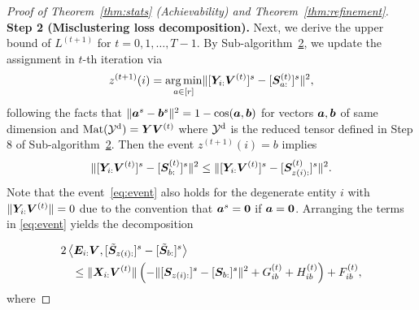 \documentclass[journal]{IEEEtran}
\theoremstyle{definition}
\theoremstyle{definition}
\newcommand{\of}[1]{\left(#1\right)}
\newcommand{\ang}[1]{\left\langle#1\right\rangle}
\begin{document}
\begin{proof}[Proof of Theorem~\ref{thm:stats} (Achievability) and Theorem~\ref{thm:refinement}]
{}

{\bf Step 2 (Misclustering loss decomposition).} Next, we derive the upper bound of $L^{(t+1)}$ for $t = 0 ,1, \ldots, T-1$. By Sub-algorithm~\hyperref[alg:main]{2}, we update the assignment in $t$-th iteration via
    \begin{equation}
        z^{(t+1)}(i) = \operatorname*{arg\,min}_{a \in [r]} \lVert [ \bm Y_{i:} \bm{V}^{(t)}  ]^s - [\bm S_{a:}^{(t)}]^s \rVert^2,
    \end{equation}
    following the facts that $\lVert\bm{a}^s - \bm{b}^s\rVert^2 = 1 - \cos(\bm{a}, \bm{b})$ for vectors $\bm{a},\bm{b}$ of same dimension and $\text{Mat}(\mathcal{Y}^\text{d}) = \bm Y \bm{V}^{(t)}$ where $\mathcal{Y}^\text{d}$ is the reduced tensor defined in Step 8 of Sub-algorithm~\hyperref[alg:main]{2}. Then the event $z^{(t+1)}(i) = b$ implies
    \begin{equation}\label{eq:event}
        \onormSize{}{ [ \mY_{i:} \mV^{(t)}  ]^s - [\mS_{b:}^{(t)}]^s }^2 \leq \onormSize{}{ [ \mY_{i:} \mV^{(t)}  ]^s - [\mS_{z(i):}^{(t)}]^s }^2.
    \end{equation}
Note that the event~\eqref{eq:event} also holds for the degenerate entity $i$ with $\lVert\bm Y_{i:} \bm{V}^{(t)}\rVert = 0$ due to the convention that $\bm{a}^s = {\bf 0}$ if $\bm{a} = {\bf 0}$. 
    Arranging the terms in \eqref{eq:event} yields the decomposition

    \vspace{-0.5cm}
    \small
    \begin{align}
        &2 \ang{ \mE_{i:} \mV, [  \tilde \mS_{z(i):} ]^s - [  \tilde \mS_{b:} ]^s } \\
        & \quad \leq \onormSize{}{\mX_{i:} \mV^{(t)}} \of{ - \onormSize{}{ [ \mS_{z(i):}  ]^s - [ \mS_{b:}  ]^s  }^2 + G_{ib}^{(t)} + H_{ib}^{(t)} } +  F_{ib}^{(t)},\label{eq:decomp}
    \end{align}
    \normalsize
    where


\end{proof}
\end{document}
